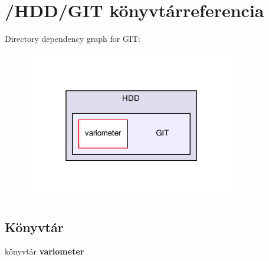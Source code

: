 \section{/\-H\-D\-D/\-G\-I\-T könyvtárreferencia}
\label{dir_d3cf4ebc5c09cf8dbf362498f8c46d20}
Directory dependency graph for G\-I\-T\-:
\nopagebreak
\begin{figure}[H]
\begin{center}
\leavevmode
\includegraphics[width=262pt]{dir_d3cf4ebc5c09cf8dbf362498f8c46d20_dep}
\end{center}
\end{figure}
\subsection*{Könyvtár}
\begin{DoxyCompactItemize}
\item 
könyvtár {\bf variometer}
\end{DoxyCompactItemize}
